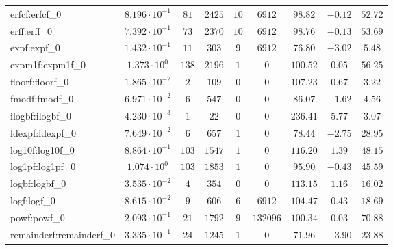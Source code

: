 \begin{tabular}{|l|c|c|c|c|c|c|c|c|}
erfcf:erfcf\_0               & $ 8.196 \cdot 10^{-1} $ & $ 81     $ & $ 2425  $ & $ 10  $ & $ 6912   $ & $ 98.82       $ & $ -0.12   $ & $ 52.72   $ \\
erff:erff\_0                 & $ 7.392 \cdot 10^{-1} $ & $ 73     $ & $ 2370  $ & $ 10  $ & $ 6912   $ & $ 98.76       $ & $ -0.13   $ & $ 53.69   $ \\
expf:expf\_0                 & $ 1.432 \cdot 10^{-1} $ & $ 11     $ & $ 303   $ & $ 9   $ & $ 6912   $ & $ 76.80       $ & $ -3.02   $ & $ 5.48    $ \\
expm1f:expm1f\_0             & $ 1.373 \cdot 10^{0}  $ & $ 138    $ & $ 2196  $ & $ 1   $ & $ 0      $ & $ 100.52      $ & $ 0.05    $ & $ 56.25   $ \\
floorf:floorf\_0             & $ 1.865 \cdot 10^{-2} $ & $ 2      $ & $ 109   $ & $ 0   $ & $ 0      $ & $ 107.23      $ & $ 0.67    $ & $ 3.22    $ \\
fmodf:fmodf\_0               & $ 6.971 \cdot 10^{-2} $ & $ 6      $ & $ 547   $ & $ 0   $ & $ 0      $ & $ 86.07       $ & $ -1.62   $ & $ 4.56    $ \\
ilogbf:ilogbf\_0             & $ 4.230 \cdot 10^{-3} $ & $ 1      $ & $ 22    $ & $ 0   $ & $ 0      $ & $ 236.41      $ & $ 5.77    $ & $ 3.07    $ \\
ldexpf:ldexpf\_0             & $ 7.649 \cdot 10^{-2} $ & $ 6      $ & $ 657   $ & $ 1   $ & $ 0      $ & $ 78.44       $ & $ -2.75   $ & $ 28.95   $ \\
log10f:log10f\_0             & $ 8.864 \cdot 10^{-1} $ & $ 103    $ & $ 1547  $ & $ 1   $ & $ 0      $ & $ 116.20      $ & $ 1.39    $ & $ 48.15   $ \\
log1pf:log1pf\_0             & $ 1.074 \cdot 10^{0}  $ & $ 103    $ & $ 1853  $ & $ 1   $ & $ 0      $ & $ 95.90       $ & $ -0.43   $ & $ 45.59   $ \\
logbf:logbf\_0               & $ 3.535 \cdot 10^{-2} $ & $ 4      $ & $ 354   $ & $ 0   $ & $ 0      $ & $ 113.15      $ & $ 1.16    $ & $ 16.02   $ \\
logf:logf\_0                 & $ 8.615 \cdot 10^{-2} $ & $ 9      $ & $ 606   $ & $ 6   $ & $ 6912   $ & $ 104.47      $ & $ 0.43    $ & $ 18.69   $ \\
powf:powf\_0                 & $ 2.093 \cdot 10^{-1} $ & $ 21     $ & $ 1792  $ & $ 9   $ & $ 132096 $ & $ 100.34      $ & $ 0.03    $ & $ 70.88   $ \\
remainderf:remainderf\_0     & $ 3.335 \cdot 10^{-1} $ & $ 24     $ & $ 1245  $ & $ 1   $ & $ 0      $ & $ 71.96       $ & $ -3.90   $ & $ 23.88   $ \\

\end{tabular}
